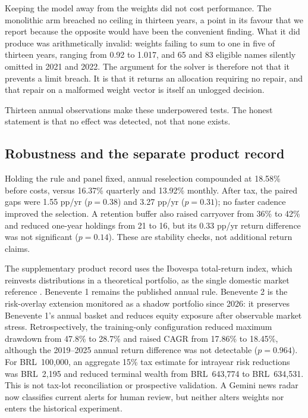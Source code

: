 \documentclass[10pt,conference]{IEEEtran}
\begin{document}
Keeping the model away from the weights did not cost performance. The monolithic arm breached no ceiling in thirteen years, a point in its favour that we report because the opposite would have been the convenient finding. What it did produce was arithmetically invalid: weights failing to sum to one in five of thirteen years, ranging from 0.92 to 1.017, and 65 and 83 eligible names silently omitted in 2021 and 2022. The argument for the solver is therefore not that it prevents a limit breach. It is that it returns an allocation requiring no repair, and that repair on a malformed weight vector is itself an unlogged decision.

Thirteen annual observations make these underpowered tests. The honest statement is that no effect was detected, not that none exists.

\subsection{Robustness and the separate product record}

Holding the rule and panel fixed, annual reselection compounded at 18.58\% before costs, versus 16.37\% quarterly and 13.92\% monthly. After tax, the paired gaps were 1.55 pp/yr ($p=0.38$) and 3.27 pp/yr ($p=0.31$); no faster cadence improved the selection. A retention buffer also raised carryover from 36\% to 42\% and reduced one-year holdings from 21 to 16, but its 0.33 pp/yr return difference was not significant ($p=0.14$). These are stability checks, not additional return claims.

The supplementary product record uses the Ibovespa total-return index, which reinvests distributions in a theoretical portfolio, as the single domestic market reference \cite{b3ibov}. Benevente 1 remains the published annual rule. Benevente 2 is the risk-overlay extension monitored as a shadow portfolio since 2026: it preserves Benevente 1's annual basket and reduces equity exposure after observable market stress. Retrospectively, the training-only configuration reduced maximum drawdown from 47.8\% to 28.7\% and raised CAGR from 17.86\% to 18.45\%, although the 2019--2025 annual return difference was not detectable ($p=0.964$). For BRL~100,000, an aggregate 15\% tax estimate for intrayear risk reductions was BRL~2,195 and reduced terminal wealth from BRL~643,774 to BRL~634,531. This is not tax-lot reconciliation or prospective validation. A Gemini news radar now classifies current alerts for human review, but neither alters weights nor enters the historical experiment.
\end{document}
